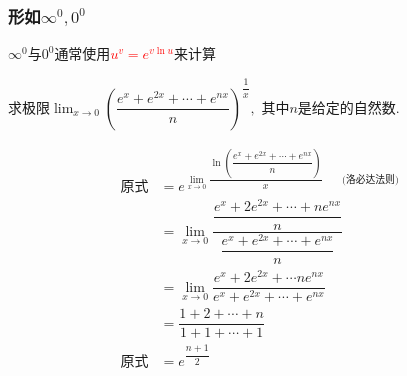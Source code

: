 \documentclass[10pt, a4paper, oneside, UTF8]{ctexbook}
\begin{document}
\begin{sloppypar}
    \subsubsection{形如$\infty^0,0^0$}
          $\infty ^0$与$0^0$通常使用\textcolor{red}
              {$ u^v=e^{v \ln u}$}来计算

              \begin{problem}
              求极限$\lim_{x\to0}\left(\dfrac{e^x+e^{2x}+\cdots+e^{nx}}n\right)^{\dfrac{1}{x}},$ 其中$n$是给定的自然数.
              \end{problem}
              \begin{solution}
                  \begin{align*}
                      \text{原式} & = e^{\lim_{x \to 0} \dfrac{\ln \left(\dfrac{e^x+e^{2x}+\cdots+e^{nx}}n\right)}{x}\qquad \text{(洛必达法则)} } \\
                                & =\lim_{x\to0}\dfrac{\dfrac{e^{x}+2e^{2x}+\cdots+ne^{nx}}{n}}{\dfrac{e^{x}+e^{2x}+\cdots+e^{nx}}{n}}       \\
                                & = \lim_{x\to0}\dfrac{e^{x}+2e^{2x}+\cdots ne^{nx}}{e^{x}+e^{2x}+\cdots+e^{nx}}                          \\
                                & =\dfrac{1+2+\cdots+n}{1+1+\cdots+1}                                                                     \\
                      \text{原式} & = e^{\dfrac{n+1}{2}}
                  \end{align*}
              \end{solution}

\end{sloppypar}
\end{document}
